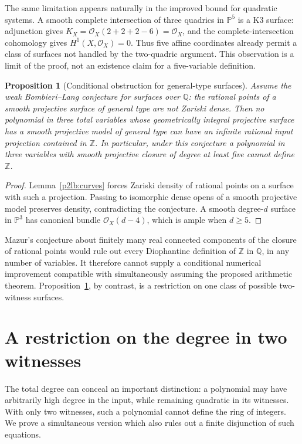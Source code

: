 \documentclass[11pt]{article}
\newtheorem{proposition}[theorem]{Proposition}
\theoremstyle{definition}
\begin{document}
The same limitation appears naturally in the improved bound for
quadratic systems.  A smooth complete intersection of three quadrics
in $\mathbb P^5$ is a K3 surface: adjunction gives
$K_X=\mathcal O_X(2+2+2-6)=\mathcal O_X$, and the
complete-intersection cohomology gives $H^1(X,\mathcal O_X)=0$.
Thus five affine coordinates already permit a class of surfaces not
handled by the two-quadric argument.  This observation is a limit of
the proof, not an existence claim for a five-variable definition.

\begin{proposition}[Conditional obstruction for general-type surfaces]
\label{p2lb:lang-surface}
Assume the weak Bombieri--Lang conjecture for surfaces over $\mathbb Q$:
the rational points of a smooth projective surface of general type are
not Zariski dense.  Then no polynomial in three total variables whose
geometrically integral projective surface has a smooth projective
model of general type can have an infinite rational input projection
contained in $\mathbb Z$.
In particular, under this conjecture a polynomial in three variables
with smooth projective closure of degree at least five cannot define
$\mathbb Z$.
\end{proposition}
\begin{proof}
Lemma~\ref{p2lb:curves} forces Zariski density of rational points
on a surface with such a projection.  Passing to isomorphic dense
opens of a smooth projective model preserves density, contradicting
the conjecture.  A smooth degree-$d$ surface in $\mathbb P^3$ has
canonical bundle $\mathcal O_X(d-4)$, which is ample when $d\geq5$.
\end{proof}

Mazur's conjecture about finitely many real connected components of
the closure of rational points would rule out every Diophantine
definition of $\mathbb Z$ in $\mathbb Q$, in any number of variables.
It therefore cannot supply a conditional numerical improvement
compatible with simultaneously assuming the proposed arithmetic
theorem.  Proposition~\ref{p2lb:lang-surface}, by contrast, is a
restriction on one class of possible two-witness surfaces.


\section{A restriction on the degree in two witnesses}
\label{sec:p2lb-conics}

The total degree can conceal an important distinction: a polynomial may
have arbitrarily high degree in the input, while remaining quadratic in
its witnesses.  With only two witnesses, such a polynomial cannot define
the ring of integers.  We prove a simultaneous version which also rules
out a finite disjunction of such equations.
\end{document}
